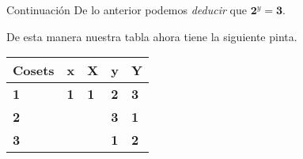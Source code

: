 \documentclass[aspectratio=169, 9pt]{beamer}
\begin{document}
\begin{frame}[fragile]{Continuación}
	De lo anterior podemos \textit{deducir} que $\textbf{2}^y = \textbf{3}$.
	
	\medskip
	\begin{center}
	\end{center}
	\pause
	
	De esta manera nuestra tabla ahora tiene la siguiente pinta.
	

	
	
	\begin{table}[]
		\begin{tabular}{|l|l|l|l|l|}
			\hline
			Cosets     & x          & X          & y          & Y          \\ \hline
			\textbf{1} & \textbf{1} & \textbf{1} & \textbf{2} & \textbf{3} \\ \hline
			\textbf{2} &            &            & \color{verde}\textbf{3} &     \textbf{1}       \\ \hline
			{\textbf{3}} &            &            &   \textbf{1}         & \color{verde}\textbf{2} \\ \hline
		\end{tabular}
	\end{table}
	
	
\end{frame}
\end{document}
